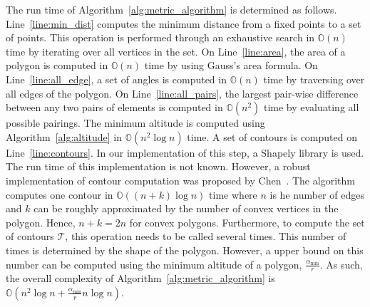 \documentclass[../main.tex]{subfiles}
\begin{document}
The run time of Algorithm~\ref{alg:metric_algorithm} is determined as follows. Line~\ref{line:min_dist} computes the minimum distance from a fixed points to a set of points. This operation is performed through an exhaustive search in $\mathbb{O}(n)$ time by iterating over all vertices in the set. On Line~\ref{line:area}, the area of a polygon is computed in $\mathbb{O}(n)$ time by using Gauss's area formula. On Line~\ref{line:all_edge}, a set of angles is computed in $\mathbb{O}(n)$ time by traversing over all edges of the polygon. On Line~\ref{line:all_pairs}, the largest pair-wise difference between any two pairs of elements is computed in $\mathbb{O}(n^2)$ time by evaluating all possible pairings. The minimum altitude is computed using Algorithm~\ref{alg:altitude} in $\mathbb{O}(n^2\log{n})$ time. A set of contours is computed on Line~\ref{line:contours}. In our implementation of this step, a Shapely library is used. The run time of this implementation is not known. However, a robust implementation of contour computation was proposed by Chen~\cite{chen2005polygon}. The algorithm computes one contour in $\mathbb{O}((n+k)\log{n})$ time where $n$ is he number of edges and $k$ can be roughly approximated by the number of convex vertices in the polygon. Hence, $n+k=2n$ for convex polygons. Furthermore, to compute the set of contours $\mathcal{T}$, this operation needs to be called several times. This number of times is determined by the shape of the polygon. However, a upper bound on this number can be computed using the minimum altitude of a polygon, $\frac{\alpha_{\min}}{r}$. As such, the overall complexity of Algorithm~\ref{alg:metric_algorithm} is $\mathbb{O}(n^2\log{n}+\frac{\alpha_{\min}}{r}n\log{n})$.
\end{document}
